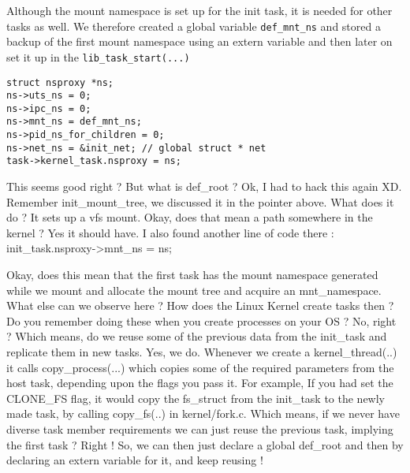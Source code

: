\documentclass{sig-alternate}
\begin{document}
Although the mount namespace is set up for the init task, it is needed for other
tasks as well.  We therefore created a global variable \texttt{def\_mnt\_ns} and
stored a backup of the first mount namespace using an extern variable and then later on set it up in the \texttt{lib\_task\_start(...)}
\begin{lstlisting}[style=CStyle]
struct nsproxy *ns;
ns->uts_ns = 0;
ns->ipc_ns = 0;
ns->mnt_ns = def_mnt_ns;
ns->pid_ns_for_children = 0;
ns->net_ns = &init_net; // global struct * net   
task->kernel_task.nsproxy = ns;
\end{lstlisting}

This seems good right ? But what  is def\_root ? Ok, I had to hack this again XD.
Remember init\_mount\_tree, we discussed it in the pointer above. What does it do ?  It sets up a vfs mount. Okay, does that mean a path somewhere 
in the kernel ? Yes it should have. I also found another line of code there : 
init\_task.nsproxy->mnt\_ns = ns;

Okay, does this mean that the first task has the mount namespace generated while we mount and allocate the mount tree and acquire an mnt\_namespace. 
What else can we observe here ? How does the Linux Kernel create tasks then ? Do you remember doing these when you create processes on your OS ? 
No, right ? Which means, do we reuse some of the previous data from the init\_task and replicate them in new tasks. Yes, we do. Whenever we create 
a kernel\_thread(..) it calls copy\_process(...) which copies some of the required parameters from the host task, depending upon the flags you pass 
it. For example, If you had set the CLONE\_FS flag, it would copy the fs\_struct from the init\_task to the newly made task, by calling copy\_fs(..)
in kernel/fork.c. Which means, if we never have diverse task member requirements we can just reuse the previous task, implying the first task ?  
Right ! So, we can then just declare a global def\_root and then by declaring an extern variable for it, and keep reusing !
\end{document}
